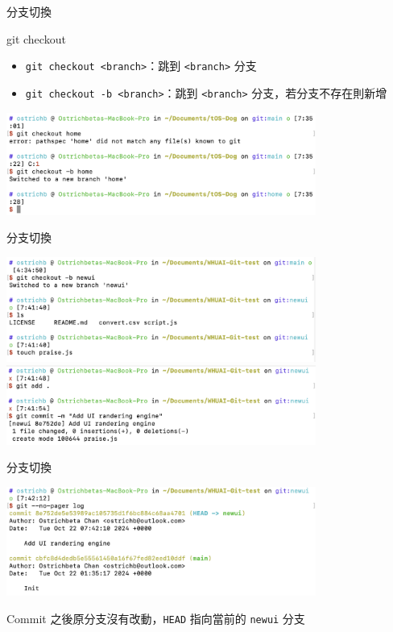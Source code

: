 \documentclass[xetex, unicode, 10pt, aspectratio=169]{beamer}
\begin{document}
\begin{frame}{分支切換}
    \begin{block}{git checkout}
        \begin{itemize}
            \item \texttt{git checkout <branch>}：跳到 \texttt{<branch>} 分支
            \item \texttt{git checkout -b <branch>}：跳到 \texttt{<branch>}
                分支，若分支不存在則新增
        \end{itemize}

        \begin{center}
            \includegraphics[width=4in]{./img/git-checkout.png}
        \end{center}
    \end{block}
\end{frame}

\begin{frame}{分支切換}
    \begin{center}
        \includegraphics[width=4in]{./img/git-new-branch-0.png}
        \includegraphics[width=4in]{./img/git-new-branch-1.png}
    \end{center}
\end{frame}

\begin{frame}{分支切換}
    \begin{center}
        \includegraphics[width=4in]{./img/git-new-branch-2.png}

        Commit 之後原分支沒有改動，\texttt{HEAD} 指向當前的 \texttt{newui} 分支
    \end{center}
\end{frame}
\end{document}
